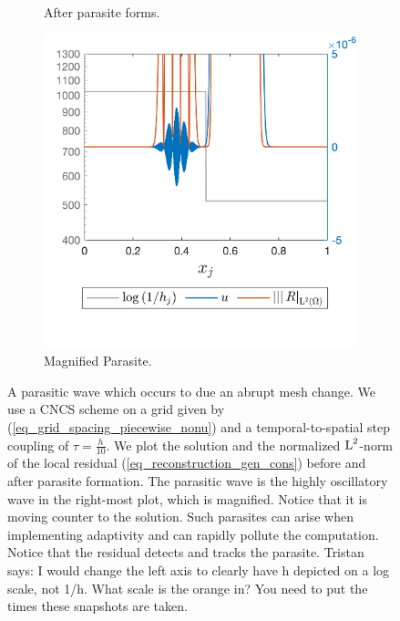 \documentclass[final]{amsart}
\newcommand{\tristan}[1]{{\color{purple} Tristan says:  #1 }}
\numberwithin{equation}{section}
\begin{document}
\begin{figure}[H]
\begin{subfigure}[b]{.3\textwidth}
    \caption{\label{fig:CNCS_parasite_1D_1}
      After parasite forms.
    }
  \end{subfigure}
  \begin{subfigure}[b]{.3\textwidth}
    \includegraphics[width=\textwidth]{../figures/fig_CNCS_parasite_rep_3800zoom_on}	
    \caption{\label{fig:CNCS_parasite_1D_2_zoom}
      Magnified Parasite.
    }
  \end{subfigure}
  \caption{A parasitic wave which occurs to due an abrupt mesh change.
    We use a CNCS scheme on a grid given by
    (\ref{eq_grid_spacing_piecewise_nonu}) and a temporal-to-spatial
    step coupling of $\tau=\frac{h}{10}$.  We plot the solution and
    the normalized $\operatorname L^{2}$-norm of the local residual
    (\ref{eq_reconstruction_gen_cons}) before and after parasite
    formation.  The parasitic wave is the highly oscillatory wave in
    the right-most plot, which is magnified.  Notice that it is moving
    counter to the solution. Such parasites can arise when
    implementing adaptivity and can rapidly pollute the
    computation. Notice that the residual detects and tracks the
    parasite. \tristan{I would change the left axis to clearly have h
      depicted on a log scale, not 1/h. What scale is the orange in?
      You need to put the times these snapshots are taken.}}
\label{fig:CNCS_parasite}
\end{figure}
\end{document}
